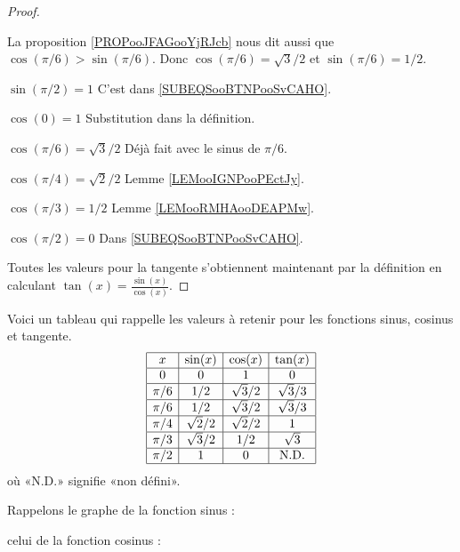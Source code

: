 \begin{proof}
\begin{subproof}
		La proposition \ref{PROPooJFAGooYjRJcb} nous dit aussi que \( \cos(\pi/6)>\sin(\pi/6)\). Donc \( \cos(\pi/6)=\sqrt{ 3 }/2\) et \( \sin(\pi/6)=1/2\).
		\item[$\sin(\pi/2)=1 $] C'est dans \eqref{SUBEQSooBTNPooSvCAHO}.
		\item[$\cos(0)=1 $] Substitution dans la définition.
		\item[$\cos(\pi/6)=\sqrt{ 3 }/2 $] Déjà fait avec le sinus de \( \pi/6\).
		\item[$\cos(\pi/4)=\sqrt{ 2 }/2 $]  Lemme \ref{LEMooIGNPooPEctJy}.
		\item[$\cos(\pi/3)=1/2 $] Lemme \ref{LEMooRMHAooDEAPMw}.
		\item[$\cos(\pi/2)=0 $] Dans \eqref{SUBEQSooBTNPooSvCAHO}.
	\end{subproof}
	Toutes les valeurs pour la tangente s'obtiennent maintenant par la définition en calculant \( \tan(x)=\frac{ \sin(x) }{ \cos(x) }\).
\end{proof}

Voici un tableau qui rappelle les valeurs à retenir pour les fonctions sinus, cosinus et tangente.
\begin{equation}\label{PGooIMQFooTnBdIl}
	\begin{array}[]{|c|c|c|c|}
		\hline
		x     & \sin(x)    & \cos(x)    & \tan(x)     \\
		\hline
		0     & 0          & 1          & 0           \\
		\hline
		\pi/6 & 1/2        & \sqrt{3}/2 & \sqrt{3}/3  \\
		\hline
		\pi/6 & 1/2        & \sqrt{3}/2 & \sqrt{3}/3  \\
		\hline
		\pi/4 & \sqrt{2}/2 & \sqrt{2}/2 & 1           \\
		\hline
		\pi/3 & \sqrt{3}/2 & 1/2        & \sqrt{3}    \\
		\hline
		\pi/2 & 1          & 0          & \text{N.D.} \\
		\hline
	\end{array}
\end{equation}
où «N.D.»  signifie «non défini».

Rappelons le graphe de la fonction sinus :
\begin{center}
	
\end{center}
celui de la fonction cosinus :
\begin{center}
	
\end{center}


